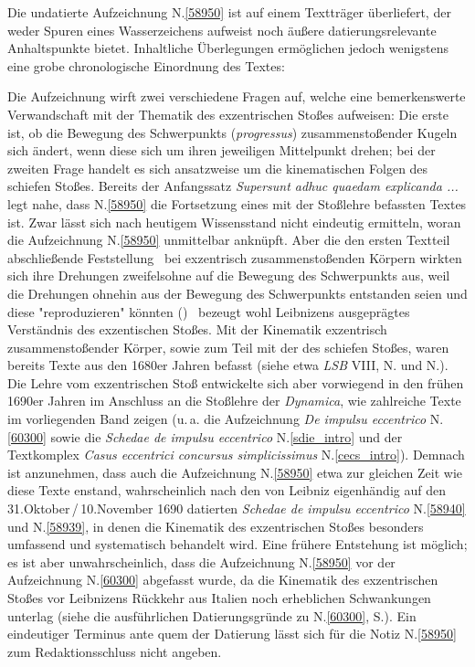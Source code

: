 \begin{ledgroup}
\footnotesize
\pstart
\noindent%
%
Die undatierte Aufzeichnung N.\;\ref{58950} ist auf einem Textträger überliefert, der weder Spuren eines Wasserzeichens aufweist noch äußere datierungsrelevante Anhaltspunkte bietet.
Inhaltliche Überlegungen ermöglichen jedoch wenigstens eine grobe chronologische Einordnung des Textes:
\pend%
\pstart%

Die Aufzeichnung wirft zwei verschiedene Fragen auf, welche eine bemerkenswerte Verwandschaft mit der Thematik des exzentrischen Stoßes aufweisen:
Die erste ist, ob die Bewegung des Schwerpunkts (\textit{progressus}) zusammenstoßender Kugeln sich ändert, wenn diese sich um ihren jeweiligen Mittelpunkt drehen;
bei der zweiten Frage handelt es sich ansatzweise um die kinematischen Folgen des schiefen Stoßes.
Bereits der Anfangssatz \textit{Supersunt adhuc quaedam explicanda ...} legt nahe, dass N.\;\ref{58950} die Fortsetzung eines mit der Stoßlehre befassten Textes ist.
Zwar lässt sich nach heutigem Wissensstand nicht eindeutig ermitteln, woran die Aufzeichnung N.\;\ref{58950} unmittelbar anknüpft.
Aber die den ersten Textteil abschließende Feststellung \textendash\ bei exzentrisch zusammenstoßenden Körpern wirkten sich ihre Drehungen zweifelsohne auf die Bewegung des Schwerpunkts aus, weil %
die Drehungen ohnehin aus der Bewegung des Schwerpunkts entstanden seien und diese "reproduzieren" könnten () \textendash\ bezeugt wohl Leibnizens ausgeprägtes Verständnis des exzentischen Stoßes.
\pend%
\pstart%
Mit der Kinematik exzentrisch zusammenstoßender Körper, sowie zum Teil mit der des schiefen Stoßes, waren bereits Texte aus den 1680er Jahren befasst (siehe etwa \textit{LSB} VIII, N. und N.).\cite{01399}\cite{01400}
Die Lehre vom exzentrischen Stoß entwickelte sich aber vorwiegend in den frühen 1690er Jahren im Anschluss an die Stoßlehre der \textit{Dynamica},\cite{01354} wie zahlreiche Texte im vorliegenden Band zeigen (u.\,a. die Aufzeichnung \textit{De impulsu eccentrico} N.\;\ref{60300} sowie die \textit{Schedae de impulsu eccentrico} N.\;\ref{sdie_intro} und der Textkomplex  \textit{Casus eccentrici concursus simplicissimus} N.\;\ref{cecs_intro}).
Demnach ist anzunehmen, dass auch die Aufzeichnung N.\;\ref{58950} etwa zur gleichen Zeit wie diese Texte enstand, wahrscheinlich nach den von Leibniz eigenhändig auf den 31.\;Oktober\,/\,10.\;November 1690 datierten \textit{Schedae de impulsu eccentrico} N.\;\ref{58940} und N.\;\ref{58939}, in denen die Kinematik des exzentrischen Stoßes besonders umfassend und systematisch behandelt wird.
Eine frühere Entstehung ist möglich;
es ist aber unwahrscheinlich, dass die Aufzeichnung N.\;\ref{58950} vor der Aufzeichnung N.\;\ref{60300} abgefasst wurde, da die Kinematik des exzentrischen Stoßes vor Leibnizens Rückkehr aus Italien noch erheblichen Schwankungen unterlag (siehe die ausführlichen Datierungsgründe zu N.\;\ref{60300}, S.\pageref{LH_37_05_044_datierung}).
\pend%
\pstart%
Ein eindeutiger Terminus ante quem der Datierung lässt sich für die Notiz N.\;\ref{58950} zum Redaktionsschluss nicht angeben.
\pend 
\end{ledgroup}
%
\frenchspacing%
\normalsize%
